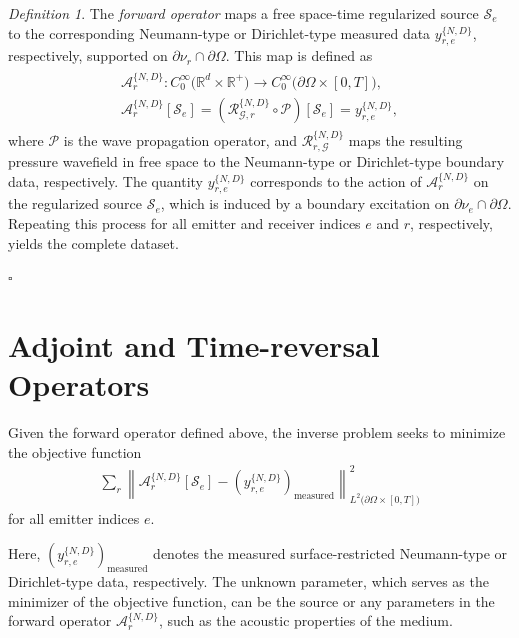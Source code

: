 \documentclass[11pt,reqno]{amsart}
\theoremstyle{remark}
\newtheorem{definition}{Definition}
\theoremstyle{italic_lemma}
\begin{document}
\begin{definition}   \label{def:operator-forward}
The \textit{forward operator} maps a free space-time regularized source \( \mathcal{S}_e \) to the corresponding Neumann-type or Dirichlet-type measured data \( y_{r,e}^{\{N,D\}} \), respectively, supported on \( \partial \nu_r \cap \partial \Omega \). This map is defined as
\begin{align} \label{eq:operator-forward}
\begin{split}
    \mathcal{A}_r^{\{N,D\}} : C_0^{\infty} \big( \mathbb{R}^d \times \mathbb{R}^+ \big) \rightarrow C_0^{\infty} \big( \partial \Omega \times [0,T] \big), \\
    \mathcal{A}_r^{\{N,D\}}[\mathcal{S}_e] = \left( \mathcal{R}_{\mathcal{G},r}^{\{N,D\}} \circ \mathcal{P} \right)[\mathcal{S}_e] = y_{r,e}^{\{N,D\}},
\end{split}
\end{align}
where \(\mathcal{P}\) is the wave propagation operator, and \(\mathcal{R}_{r,\mathcal{G}}^{\{N,D\}}\) maps the resulting pressure wavefield in free space to the Neumann-type or Dirichlet-type boundary data, respectively. The quantity \( y_{r,e}^{\{N,D\}} \) corresponds to the action of \(\mathcal{A}_r^{\{N,D\}}\) on the regularized source \(\mathcal{S}_e\), which is induced by a boundary excitation on \(\partial \nu_e \cap \partial \Omega\). Repeating this process for all emitter and receiver indices \(e\) and \(r\), respectively, yields the complete dataset.
\end{definition}
\hfill \(\square\)




\section{Adjoint and Time-reversal Operators}  \label{sec:adjoint}

Given the forward operator defined above, the inverse problem seeks to minimize the objective function
\begin{align}
\sum_r \left\| \mathcal{A}_r^{\{N,D\}}[\mathcal{S}_e] - (y_{r,e}^{\{N,D\}})_{\text{measured}} \right\|_{L^2\big( \partial \Omega \times [0,T] \big)}^2
\end{align}
for all emitter indices \(e\).

Here, \( (y_{r,e}^{\{N,D\}})_{\text{measured}} \) denotes the measured surface-restricted Neumann-type or Dirichlet-type data, respectively. The unknown parameter, which serves as the minimizer of the objective function, can be the source or any parameters in the forward operator \( \mathcal{A}_r^{\{N,D\}} \), such as the acoustic properties of the medium.
\end{document}
